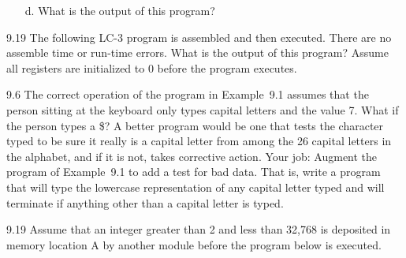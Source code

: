 \documentclass{patt}
\begin{document}
\begin{exercises}
\begin{enumerate}[a.]
\item[d.] What is the output of this program?
\end{enumerate}

\item[9.19] The following LC-3 program is assembled and then executed. There are
no assemble time or run-time errors.  What is the output of this
program? Assume all registers are initialized to 0 before the program executes.

\item[9.6] The correct operation of the program in Example~9.1 assumes
  that the person sitting at the keyboard only types capital letters
  and the value 7.  What if the person types a \$? A better program
  would be one that tests the character typed to be sure it really is
  a capital letter from among the 26 capital letters in the alphabet,
  and if it is not, takes corrective action.  Your job: Augment the
  program of Example~9.1 to add a test for bad data.  That is, write a
  program that will type the lowercase representation of any capital
  letter typed and will terminate if anything other than a capital
  letter is typed.

\item[9.19] Assume that an integer greater than 2 and less than 32,768 is deposited
in memory location A by another module before the program below is executed.


\end{exercises}
\end{document}
